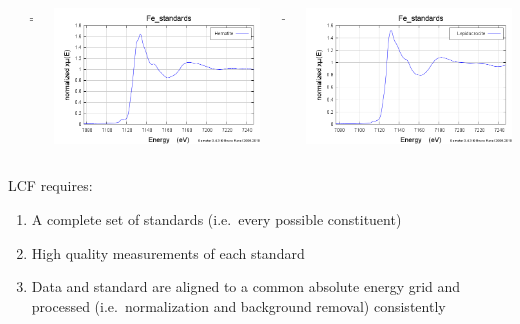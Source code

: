 \documentclass[10pt, xcolor=x11names, compress]{beamer}
\begin{document}
\begin{frame}
\begin{columns}
\begin{column}{0.2\linewidth}
    \end{column}
    \begin{column}{0.03\linewidth}
      =
    \end{column}
    \begin{column}{0.2\linewidth}
      \includegraphics[width=\linewidth]{images/hematite.png} 
    \end{column}
    \begin{column}{0.03\linewidth}
      +
    \end{column}
    \begin{column}{0.2\linewidth}
      \includegraphics[width=\linewidth]{images/lepidocrocite.png}
    \end{column}
  \end{columns}

  \bigskip

  LCF requires:
  \begin{enumerate}
  \item A complete set of standards (i.e.\ every possible constituent)
  \item High quality measurements of each standard
  \item Data and standard are aligned to a common absolute energy grid
    and processed (i.e.\ normalization and background removal)
    consistently
  \end{enumerate}
\end{frame}
\end{document}
